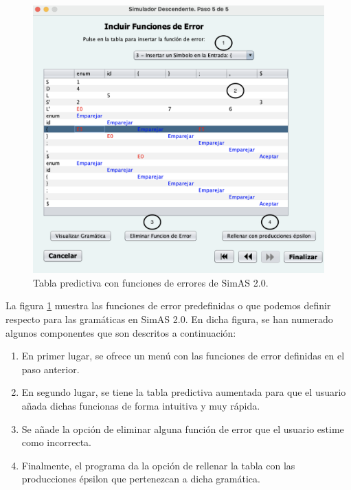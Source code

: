 \begin{figure}[htp]
 	\begin{center}
      \includegraphics[scale=0.5]{figuras/Cap3/SimAS2/paso5.png} 
       \caption{Tabla predictiva con funciones de errores de SimAS 2.0.}\label{fig:SimAS-2.0-paso5}
 	\end{center}
\end{figure}

La figura \ref{fig:SimAS-2.0-paso5} muestra las funciones de error predefinidas o que podemos definir respecto para las gramáticas en SimAS 2.0. En dicha figura, se han numerado algunos componentes que son descritos a continuación:
 \begin{enumerate}
     \item En primer lugar, se ofrece un menú con las funciones de error definidas en el paso anterior.
     \item En segundo lugar, se tiene la tabla predictiva aumentada para que el usuario añada dichas funcionas de forma intuitiva y muy rápida.
     \item Se añade la opción de eliminar alguna función de error que el usuario estime como incorrecta.
     \item Finalmente, el programa da la opción de rellenar la tabla con las producciones épsilon que pertenezcan a dicha gramática.
 \end{enumerate}


